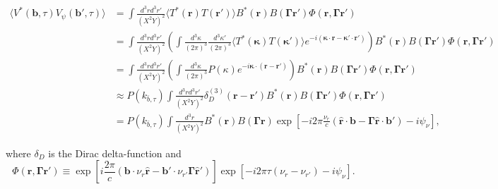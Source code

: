 \documentclass[twocolumn,apj,numberedappendix]{emulateapj}
\renewcommand\[{\begin{equation}}
\renewcommand\]{\end{equation}}
\begin{document}
\begin{widetext}
\begin{equation}
\begin{aligned} \langle V^{*}(\boldsymbol{b},\tau)V_{\psi}(\boldsymbol{b'},\tau)\rangle
 & =\int \frac{d^{3}rd^{3}r'}{(X^2Y)^2}\langle T^{*}(\boldsymbol{r})T(\boldsymbol{r'})\rangle B^{*}(\boldsymbol{r})B(\boldsymbol{\Gamma} \boldsymbol{r'})\Phi(\boldsymbol{r},\boldsymbol{\Gamma} \boldsymbol{r'})\\
 & =\int \frac{d^{3}rd^{3}r'}{(X^2Y)^2}\left(\int\frac{d^{3}\kappa}{(2\pi)^{3}}\frac{d^{3}\kappa'}{(2\pi)^{3}}\langle T^{*}(\boldsymbol{\kappa})T(\boldsymbol{\kappa'})\rangle e^{-i(\boldsymbol{\kappa}\cdot \boldsymbol{r}-\boldsymbol{\kappa'}\cdot\boldsymbol{r'})}\right)B^{*}(\boldsymbol{r})B(\boldsymbol{\Gamma} \boldsymbol{r'})\Phi(\boldsymbol{r},\boldsymbol{\Gamma} \boldsymbol{r'})\\
 & =\int \frac{d^{3}rd^{3}r'}{(X^2Y)^2}\left(\int\frac{d^{3}\kappa}{(2\pi)^{3}}P(\kappa)e^{-i\boldsymbol{\kappa}\cdot(\boldsymbol{r}-\boldsymbol{r'})}\right)B^{*}(\boldsymbol{r})B(\boldsymbol{\Gamma} \boldsymbol{r'})\Phi(\boldsymbol{r},\boldsymbol{\Gamma} \boldsymbol{r'})\\
 & \approx P(k_{\bar{b}, \tau})\int \frac{d^{3}rd^{3}r'}{(X^2Y)^2} \delta_{D}^{(3)}(\boldsymbol{r}-\boldsymbol{r'})B^{*}(\boldsymbol{r})B(\boldsymbol{\Gamma} \boldsymbol{r'}) \Phi(\boldsymbol{r},\boldsymbol{\Gamma} \boldsymbol{r'})\\
 & = P(k_{\bar{b}, \tau})\int \frac{d^{3}r}{(X^2Y)^2}B^{*}(\boldsymbol{r})B(\boldsymbol{\Gamma} \boldsymbol{r})\exp\left[-i2\pi\frac{\nu_{r}}{c}\left(\hat{\boldsymbol{r}}\cdot\boldsymbol{b}-\boldsymbol{\Gamma} \hat{\boldsymbol{r}}\cdot\boldsymbol{b'}\right)-i\psi_{\nu}\right],
\end{aligned}
\label{eq:main}
\end{equation}

where $\delta_D$ is the Dirac delta-function and
\begin{equation}
\Phi(\boldsymbol{r},\boldsymbol{\Gamma} \boldsymbol{r'})\equiv\exp\left[i\frac{2\pi}{c}\left(\boldsymbol{b}\cdot\nu_{r}\hat{\boldsymbol{r}}-\boldsymbol{b'}\cdot\nu_{r'}\boldsymbol{\Gamma}\hat{\boldsymbol{r}}'\right)\right]\exp\left[-i2\pi\tau\left(\nu_{r}-\nu_{r'}\right)-i\psi_{\nu}\right].
\end{equation}

\end{widetext}
\end{document}
